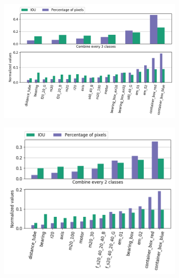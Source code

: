 		\begin{figure}
			\begin{subfigure}{1\textwidth}
				\centering
				\includegraphics[width=1\linewidth]{images/cls_iou_full}
				\caption{}
				\label{Fig:clsioua}
			\end{subfigure}
			\begin{subfigure}{.53\textwidth}
				\centering
				\includegraphics[width=1\linewidth]{images/cls_iou_size}
				\caption{}
				\label{Fig:clsioub}
			\end{subfigure}
			\begin{subfigure}{.47\textwidth}
				\centering

\end{subfigure}
\end{figure}
